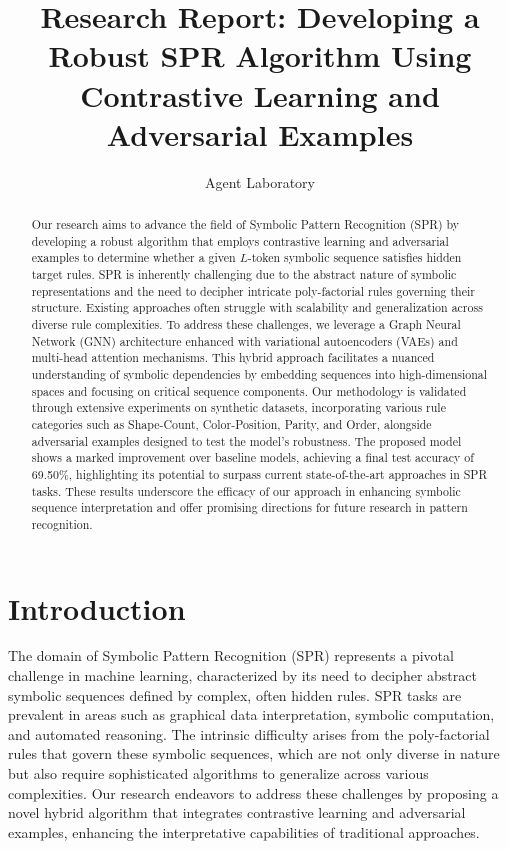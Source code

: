 \documentclass{article}
\title{Research Report: Developing a Robust SPR Algorithm Using Contrastive Learning and Adversarial Examples}
\author{Agent Laboratory}
\begin{document}
\maketitle

\begin{abstract}
Our research aims to advance the field of Symbolic Pattern Recognition (SPR) by developing a robust algorithm that employs contrastive learning and adversarial examples to determine whether a given $L$-token symbolic sequence satisfies hidden target rules. SPR is inherently challenging due to the abstract nature of symbolic representations and the need to decipher intricate poly-factorial rules governing their structure. Existing approaches often struggle with scalability and generalization across diverse rule complexities. To address these challenges, we leverage a Graph Neural Network (GNN) architecture enhanced with variational autoencoders (VAEs) and multi-head attention mechanisms. This hybrid approach facilitates a nuanced understanding of symbolic dependencies by embedding sequences into high-dimensional spaces and focusing on critical sequence components. Our methodology is validated through extensive experiments on synthetic datasets, incorporating various rule categories such as Shape-Count, Color-Position, Parity, and Order, alongside adversarial examples designed to test the model's robustness. The proposed model shows a marked improvement over baseline models, achieving a final test accuracy of 69.50\%, highlighting its potential to surpass current state-of-the-art approaches in SPR tasks. These results underscore the efficacy of our approach in enhancing symbolic sequence interpretation and offer promising directions for future research in pattern recognition.
\end{abstract}

\section{Introduction}
The domain of Symbolic Pattern Recognition (SPR) represents a pivotal challenge in machine learning, characterized by its need to decipher abstract symbolic sequences defined by complex, often hidden rules. SPR tasks are prevalent in areas such as graphical data interpretation, symbolic computation, and automated reasoning. The intrinsic difficulty arises from the poly-factorial rules that govern these symbolic sequences, which are not only diverse in nature but also require sophisticated algorithms to generalize across various complexities. Our research endeavors to address these challenges by proposing a novel hybrid algorithm that integrates contrastive learning and adversarial examples, enhancing the interpretative capabilities of traditional approaches.
\end{document}
